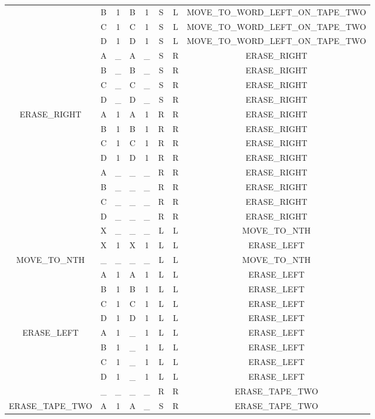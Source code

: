 \documentclass{report}
\begin{document}
\begin{adjustwidth}{-1.5cm}{0cm}
\begin{tabular}{| c | c c | c c | c c | c |}
  & B & 1 & B & 1 & S & L & MOVE\_TO\_WORD\_LEFT\_ON\_TAPE\_TWO \\
  & C & 1 & C & 1 & S & L & MOVE\_TO\_WORD\_LEFT\_ON\_TAPE\_TWO \\
  & D & 1 & D & 1 & S & L & MOVE\_TO\_WORD\_LEFT\_ON\_TAPE\_TWO \\
  & A & \_ & A & \_ & S & R & ERASE\_RIGHT \\
  & B & \_ & B & \_ & S & R & ERASE\_RIGHT \\
  & C & \_ & C & \_ & S & R & ERASE\_RIGHT \\
       & D & \_ & D & \_ & S & R & ERASE\_RIGHT \\
  \hline
  ERASE\_RIGHT & A & 1 & A & 1 & R & R & ERASE\_RIGHT \\
       & B & 1 & B & 1 & R & R & ERASE\_RIGHT \\
       & C & 1 & C & 1 & R & R & ERASE\_RIGHT \\
       & D & 1 & D & 1 & R & R & ERASE\_RIGHT \\
       & A & \_ & \_ & \_ & R & R & ERASE\_RIGHT \\
       & B & \_ & \_ & \_ & R & R & ERASE\_RIGHT \\
       & C & \_ & \_ & \_ & R & R & ERASE\_RIGHT \\
       & D & \_ & \_ & \_ & R & R & ERASE\_RIGHT \\
       & X & \_ & \_ & \_ & L & L & MOVE\_TO\_NTH \\
       & X & 1 & X & 1 & L & L & ERASE\_LEFT \\
  \hline
  MOVE\_TO\_NTH & \_ & \_ & \_ & \_ & L & L & MOVE\_TO\_NTH \\
       & A & 1 & A & 1 & L & L & ERASE\_LEFT \\
       & B & 1 & B & 1 & L & L & ERASE\_LEFT \\
       & C & 1 & C & 1 & L & L & ERASE\_LEFT \\
       & D & 1 & D & 1 & L & L & ERASE\_LEFT \\
  \hline
  ERASE\_LEFT & A & 1 & \_ & 1 & L & L & ERASE\_LEFT \\
       & B & 1 & \_ & 1 & L & L & ERASE\_LEFT \\
       & C & 1 & \_ & 1 & L & L & ERASE\_LEFT \\
       & D & 1 & \_ & 1 & L & L & ERASE\_LEFT \\
       & \_ & \_ & \_ & \_ & R & R & ERASE\_TAPE\_TWO \\
  \hline
  ERASE\_TAPE\_TWO & A & 1 & A & \_ & S & R & ERASE\_TAPE\_TWO \\

\end{tabular}
\end{adjustwidth}
\end{document}
